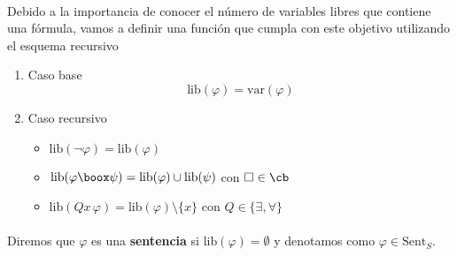 \paragraph{}
Debido a la importancia de conocer el número de variables libres que contiene una fórmula, vamos a definir una función que cumpla con este objetivo utilizando el esquema recursivo
\begin{enumerate}
	\item Caso base 
	\[ \mbox{lib}(\varphi)= \mbox{var}(\varphi) \]
	\item Caso recursivo 
	\begin{itemize}
		\item $\mbox{lib}(\neg \varphi)= \mbox{lib}(\varphi)$
		\item $\mbox{lib}(\varphi \boox  \psi)= \mbox{lib}(\varphi) \cup \mbox{lib}(\psi)$ con $\Box \in \cb$
		\item $\mbox{lib}(Qx\, \varphi)= \mbox{lib}(\varphi) \setminus \{x\}$ con $Q \in \{\exists, \forall\}$
	\end{itemize}
\end{enumerate}
\paragraph{}
\begin{definition}
Diremos que $\varphi$ es una \textbf{sentencia} si $\mbox{lib}(\varphi)=\emptyset$ y denotamos como $\varphi \in \mbox{Sent}_S$.
\end{definition}
